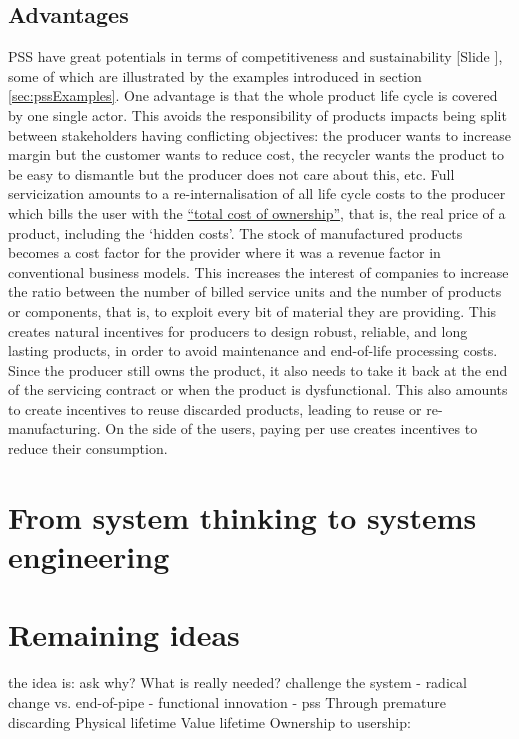 \documentclass{article}
\newcounter{slide}
\begin{document}
\subsection{Advantages}
\label{sec:pssAdvantages}
PSS have great potentials in terms of competitiveness and sustainability {\color{blue}[Slide ]}, some of which are illustrated by the examples introduced in section \ref{sec:pssExamples}. One advantage is that the whole product life cycle is covered by one single actor. This avoids the responsibility of products impacts being split between stakeholders having conflicting objectives: the producer wants to increase margin but the customer wants to reduce cost, the recycler wants the product to be easy to dismantle but the producer does not care about this, etc. Full servicization amounts to a re-internalisation of all life cycle costs to the producer which bills the user with the \href{https://en.wikipedia.org/wiki/Total_cost_of_ownership}{``total cost of ownership''}, that is, the real price of a product, including the `hidden costs'. The stock of manufactured products becomes a cost factor for the provider where it was a revenue factor in conventional business models. This increases the interest of companies to increase the ratio between the number of billed service units and the number of products or components, that is, to exploit every bit of material they are providing. This creates natural incentives for producers to design robust, reliable, and long lasting products, in order to avoid maintenance and end-of-life processing costs. Since the producer still owns the product, it also needs to take it back at the end of the servicing contract or when the product is dysfunctional. This also amounts to create incentives to reuse discarded products, leading to reuse or re-manufacturing. On the side of the users, paying per use creates incentives to reduce their consumption. 

\section{From system thinking to systems engineering}
\label{sec:sysEng}

 
{\color{red}
\section*{Remaining ideas}
the idea is: ask why? What is really needed? challenge the system
 - radical change vs. end-of-pipe 
 - functional innovation
 - pss
Through premature discarding
Physical lifetime  Value lifetime 
Ownership to usership: %
}
\end{document}
